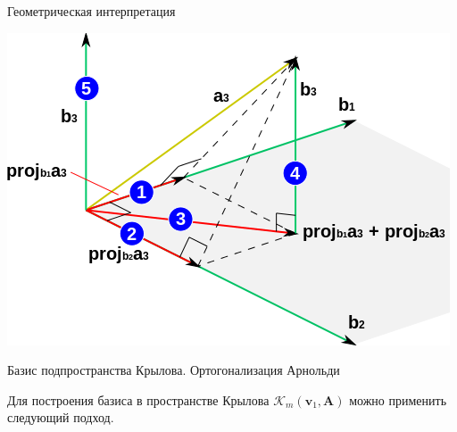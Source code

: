 \documentclass[10pt,xcolor=pst,aspectratio=169]{beamer}
\begin{document}
\begin{frame}{Геометрическая интерпретация}

	\transdissolve[duration=0.2]
	\justifying
	\large
	\begin{center}
		\includegraphics[width=0.8\linewidth]{Gram-schmidt-step3base.png}
	\end{center}

\end{frame}

\begin{frame}{Базис подпространства Крылова. Ортогонализация Арнольди}

	\transdissolve[duration=0.2]
	\justifying
	\large
	Для построения базиса в пространстве Крылова $\mathcal{K}_{m} (\textbf{v}_{1} , \textbf{A})$ можно применить следующий подход. %

\end{frame}
\end{document}
